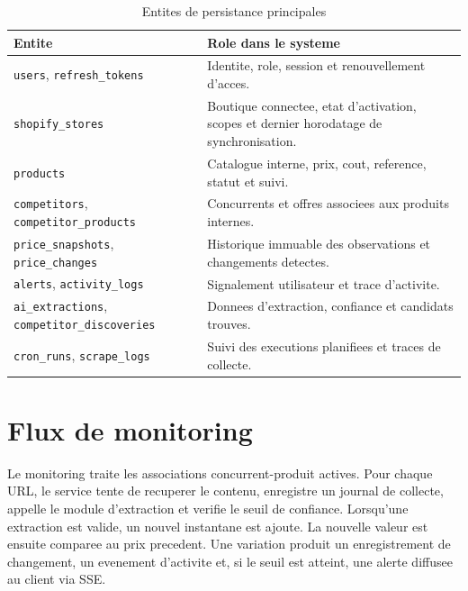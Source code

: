 \documentclass[12pt,a4paper,oneside]{report}
\begin{document}
\begin{table}[H]
\centering
\caption{Entites de persistance principales}
\label{tab:data-model}
\begin{tabularx}{\textwidth}{p{}Y}
\toprule
\textbf{Entite} & \textbf{Role dans le systeme} \\
\midrule
\texttt{users}, \texttt{refresh\_tokens} & Identite, role, session et renouvellement d'acces. \\
\texttt{shopify\_stores} & Boutique connectee, etat d'activation, scopes et dernier horodatage de synchronisation. \\
\texttt{products} & Catalogue interne, prix, cout, reference, statut et suivi. \\
\texttt{competitors}, \texttt{competitor\_products} & Concurrents et offres associees aux produits internes. \\
\texttt{price\_snapshots}, \texttt{price\_changes} & Historique immuable des observations et changements detectes. \\
\texttt{alerts}, \texttt{activity\_logs} & Signalement utilisateur et trace d'activite. \\
\texttt{ai\_extractions}, \texttt{competitor\_discoveries} & Donnees d'extraction, confiance et candidats trouves. \\
\texttt{cron\_runs}, \texttt{scrape\_logs} & Suivi des executions planifiees et traces de collecte. \\
\bottomrule
\end{tabularx}
\end{table}

\section{Flux de monitoring}
Le monitoring traite les associations concurrent-produit actives. Pour chaque URL, le service tente de recuperer le contenu, enregistre un journal de collecte, appelle le module d'extraction et verifie le seuil de confiance. Lorsqu'une extraction est valide, un nouvel instantane est ajoute. La nouvelle valeur est ensuite comparee au prix precedent. Une variation produit un enregistrement de changement, un evenement d'activite et, si le seuil est atteint, une alerte diffusee au client via SSE.
\end{document}
